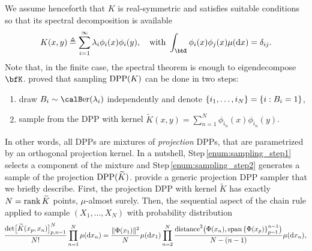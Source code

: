 \documentclass[twoside,11pt]{article}
\begin{document}
        We assume henceforth that $K$ is real-symmetric and satisfies suitable conditions \citet[][Theorem\,3]{Sos00} so that its spectral decomposition is available
        \begin{equation*}
        \setlength{\belowdisplayskip}{0pt}
        \setlength{\belowdisplayshortskip}{0pt}
        \setlength{\abovedisplayskip}{0pt}
        \setlength{\abovedisplayshortskip}{0pt}
        \label{eq:eigdec_kernel}
        K(x,y)
        \triangleq
          \suml_{i=1}^{\infty}
            \lambda_i \phi_i(x) \phi_i(y),
          \quad \text{with }
            \int_{\bbX} \phi_i(x) \phi_j(x) \mu(\diff x) = \delta_{ij}.
        \end{equation*}
        Note that, in the finite case, the spectral theorem is enough to eigendecompose $\bfK$.
         proved that sampling $\operatorname{DPP}(K)$ can be done in two steps:
        \begin{enumerate}
            \item draw $B_i\sim\Ber(\lambda_i)$ independently and denote $\left\{ i_1,\dots,i_{N} \right\} = \left\{ i:B_i=1 \right\}$,\label{enum:sampling_step1}
            \item sample from the DPP with kernel $\tilde{K}(x,y) = \sum_{n=1}^{N}\phi_{i_n}(x) \phi_{i_n}(y)$.\label{enum:sampling_step2}
        \end{enumerate}
        In other words, all DPPs are mixtures of \emph{projection} DPPs, that are parametrized by an orthogonal projection kernel.
        In a nutshell, Step\,\ref{enum:sampling_step1} selects a component of the mixture and Step\,\ref{enum:sampling_step2} generates a sample of the projection $\operatorname{DPP}(\widetilde{K})$.
         provide a generic projection DPP sampler that we briefly describe.
        First, the projection DPP with kernel $\tilde{K}$ has exactly $N=\operatorname{rank} \widetilde{K}$ points, $\mu$-almost surely.
        Then, the sequential aspect of the chain rule applied to sample $(X_1,\dots,X_N)$ with probability distribution
        \begin{equation}
        \label{eq:joint_distribution}
        \!
        \small
        \frac{\det\!\big[\widetilde K(x_p,x_n)\big]_{p,n=1}^N}{N!}
            \prod_{n=1}^N \mu(\mathop{}\!\mathrm{d} x_n)
        =
                \frac{\|\Phi(x_1)\|^2}{N}
            \mu(\mathop{}\!\mathrm{d} x_1)
            \prod_{n=2}^{N}
                \frac{\operatorname{distance}^2\!\big(\Phi(x_n), \operatorname{span}\left\{ \Phi(x_p) \right\}_{p=1}^{n-1}\!\big)}{N-(n-1)}
                \mu(\mathop{}\!\mathrm{d} x_n),
        \end{equation}
\end{document}
